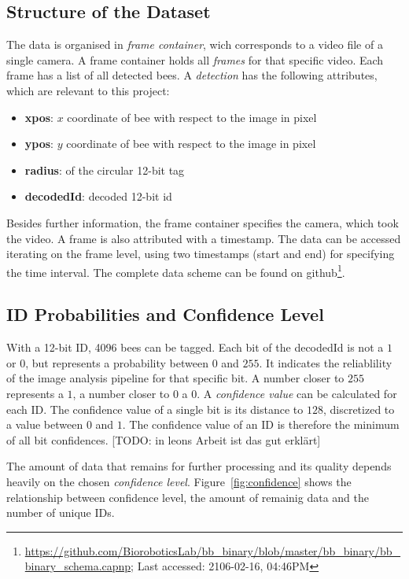 \subsection{Structure of the Dataset}
The data is organised in \emph{frame container}, wich corresponds to a video file of a single camera. A frame container holds all \emph{frames} for that specific video.
Each frame has a list of all detected bees.
A \emph{detection} has the following attributes, which are relevant to this project:

\begin{itemize}
\item \textbf{xpos}: $x$ coordinate of bee with respect to the image in pixel
\item \textbf{ypos}: $y$ coordinate of bee with respect to the image in pixel
\item \textbf{radius}: of the circular 12-bit tag
\item \textbf{decodedId}: decoded 12-bit id
\end{itemize}

Besides further information, the frame container specifies the camera, which took the video. A frame is also attributed with a timestamp. The data can be accessed iterating on the frame level, using two timestamps (start and end) for specifying the time interval. The complete data scheme can be found on github\footnote{\url{https://github.com/BioroboticsLab/bb_binary/blob/master/bb_binary/bb_binary_schema.capnp}; Last accessed: 2106-02-16, 04:46PM}. 


\subsection{ID Probabilities and Confidence Level}
\label{subsec:confidence}
With a 12-bit ID, 4096 bees can be tagged.
Each bit of the decodedId is not a $1$ or $0$, but represents a probability between $0$ and $255$. It indicates the reliablility of the image analysis pipeline for that specific bit.  A number closer to $255$ represents a $1$, a number closer to $0$ a $0$.
A \emph{confidence value} can be calculated for each ID. The confidence value of a single bit is its distance to $128$, discretized to a value between $0$ and $1$. The confidence value of an ID is therefore the minimum of all bit confidences. [TODO: in leons Arbeit ist das gut erklärt]

The amount of data that remains for further processing and its quality  depends heavily on the chosen \emph{confidence level}. Figure~\ref{fig:confidence} shows the relationship between confidence level, the amount of remainig data and the number of unique IDs. 

